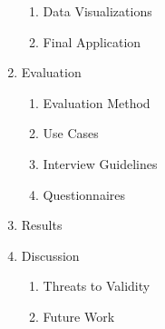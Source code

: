 \documentclass[10pt,a4paper]{scrartcl} %
\begin{document}
\begin{figure}[h]
\begin{enumerate}[label*=\arabic*.]
\begin{enumerate}[label*=\arabic*]
			\item Data Visualizations
			\item Final Application
		\end{enumerate}	
		\item Evaluation
		\begin{enumerate}[label*=\arabic*]
			\item Evaluation Method
			\item Use Cases
			\item Interview Guidelines
			\item Questionnaires
		\end{enumerate}
		\item Results
		\item Discussion
		\begin{enumerate}[label*=\arabic*]
			\item Threats to Validity
			\item Future Work
		\end{enumerate}
		
		
	\end{enumerate}
	\label{fig:Structure}
\end{figure}


\pagebreak


\end{document}
